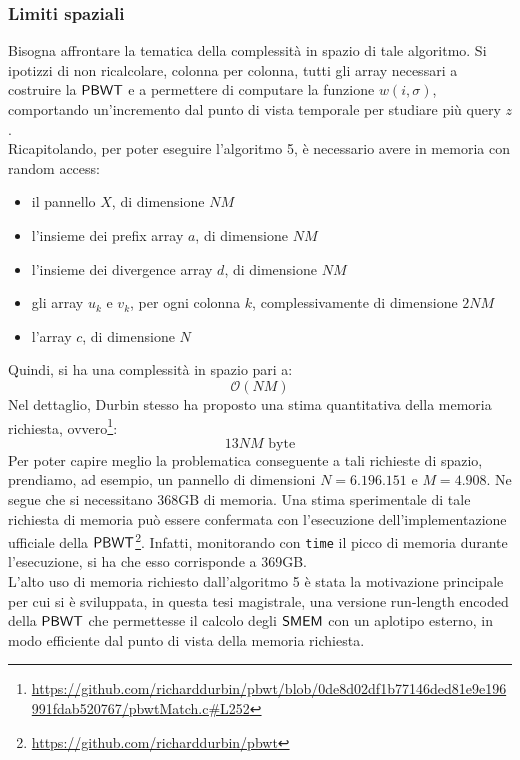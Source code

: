 \subsubsection{Limiti spaziali}
Bisogna affrontare la tematica della complessità in spazio di tale
algoritmo. Si ipotizzi di non ricalcolare, colonna per colonna, tutti gli array  
necessari a costruire la $\mbox{\rm {\sf PBWT}}$ e a permettere di computare la funzione
$w(i,\sigma)$, comportando
un'incremento dal punto di vista temporale per studiare più query
$z$.\\
Ricapitolando, per poter eseguire l'algoritmo 5, è necessario avere in
memoria con random access:
\begin{itemize}
  \item il pannello $X$, di dimensione $\mathit{NM}$
  \item l'insieme dei prefix array $a$, di dimensione $\mathit{NM}$
  \item l'insieme dei divergence array $d$, di dimensione $\mathit{NM}$
  \item gli array $u_k$ e $v_k$, per ogni colonna $k$, complessivamente
  di dimensione $2\mathit{NM}$ 
  \item l'array $c$, di dimensione $N$
\end{itemize}
Quindi, si ha una complessità in spazio pari a:
\begin{equation}
  \label{eq:pbwtsize}
  \mathcal{O}(\mathit{NM})
\end{equation}
Nel dettaglio, Durbin stesso ha proposto una stima quantitativa della memoria
richiesta,
ovvero\footnote{\scriptsize{\url{https://github.com/richarddurbin/pbwt/blob/0de8d02df1b77146ded81e9e196991fdab520767/pbwtMatch.c\#L252}}}:
\begin{equation}
  \label{eq:pbwtsize2}
  13\mathit{NM}\mbox{ byte}
\end{equation}
Per poter capire meglio la problematica conseguente a tali richieste di spazio,
prendiamo, ad esempio, un pannello di 
dimensioni $N= 6.196.151$ e $M=4.908$. Ne segue che si necessitano 368GB di
memoria. Una stima 
sperimentale di tale richiesta di memoria può essere confermata con l'esecuzione
dell'implementazione ufficiale della
$\mbox{\rm {\sf PBWT}}$\footnote{\url{https://github.com/richarddurbin/pbwt}}. Infatti,
monitorando  
con \texttt{time} il picco di memoria durante l'esecuzione, si ha che esso
corrisponde a 369GB. \\
L'alto uso di memoria richiesto dall'algoritmo 5 è 
stata la motivazione principale per cui si è sviluppata, in questa tesi
magistrale, una versione run-length encoded della $\mbox{\rm {\sf PBWT}}$ che permettesse il
calcolo degli $\mbox{\rm {\sf SMEM}}$ con un aplotipo esterno, in modo efficiente dal punto di
vista della memoria richiesta.
